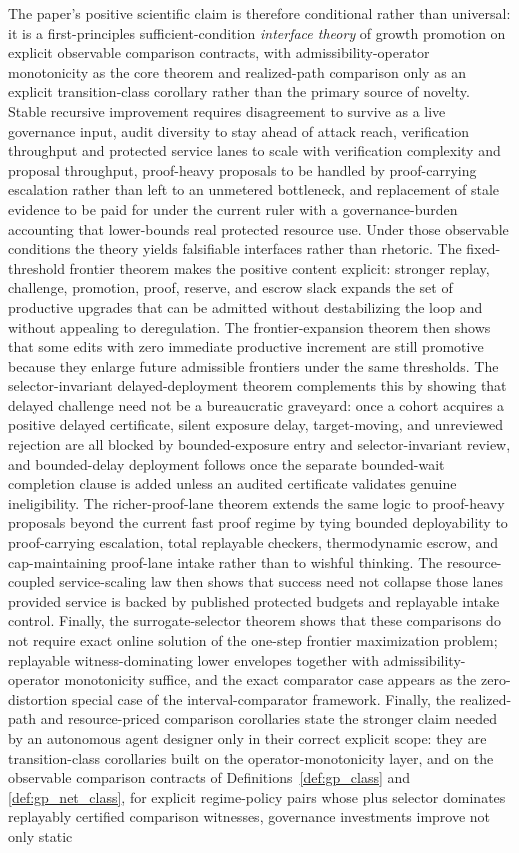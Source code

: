 \documentclass[11pt]{article}
\theoremstyle{definition}
\newcommand{\1}{\mathbf{1}}
\begin{document}
The paper's positive scientific claim is therefore conditional rather than universal: it is a first-principles sufficient-condition \emph{interface theory} of growth promotion on explicit observable comparison contracts, with admissibility-operator monotonicity as the core theorem and realized-path comparison only as an explicit transition-class corollary rather than the primary source of novelty. Stable recursive improvement requires disagreement to survive as a live governance input, audit diversity to stay ahead of attack reach, verification throughput and protected service lanes to scale with verification complexity and proposal throughput, proof-heavy proposals to be handled by proof-carrying escalation rather than left to an unmetered bottleneck, and replacement of stale evidence to be paid for under the current ruler with a governance-burden accounting that lower-bounds real protected resource use. Under those observable conditions the theory yields falsifiable interfaces rather than rhetoric. The fixed-threshold frontier theorem makes the positive content explicit: stronger replay, challenge, promotion, proof, reserve, and escrow slack expands the set of productive upgrades that can be admitted without destabilizing the loop and without appealing to deregulation. The frontier-expansion theorem then shows that some edits with zero immediate productive increment are still promotive because they enlarge future admissible frontiers under the same thresholds. The selector-invariant delayed-deployment theorem complements this by showing that delayed challenge need not be a bureaucratic graveyard: once a cohort acquires a positive delayed certificate, silent exposure delay, target-moving, and unreviewed rejection are all blocked by bounded-exposure entry and selector-invariant review, and bounded-delay deployment follows once the separate bounded-wait completion clause is added unless an audited certificate validates genuine ineligibility. The richer-proof-lane theorem extends the same logic to proof-heavy proposals beyond the current fast proof regime by tying bounded deployability to proof-carrying escalation, total replayable checkers, thermodynamic escrow, and cap-maintaining proof-lane intake rather than to wishful thinking. The resource-coupled service-scaling law then shows that success need not collapse those lanes provided service is backed by published protected budgets and replayable intake control. Finally, the surrogate-selector theorem shows that these comparisons do not require exact online solution of the one-step frontier maximization problem; replayable witness-dominating lower envelopes together with admissibility-operator monotonicity suffice, and the exact comparator case appears as the zero-distortion special case of the interval-comparator framework. Finally, the realized-path and resource-priced comparison corollaries state the stronger claim needed by an autonomous agent designer only in their correct explicit scope: they are transition-class corollaries built on the operator-monotonicity layer, and on the observable comparison contracts of Definitions~\ref{def:gp_class} and \ref{def:gp_net_class}, for explicit regime-policy pairs whose plus selector dominates replayably certified comparison witnesses, governance investments improve not only static 
\end{document}
